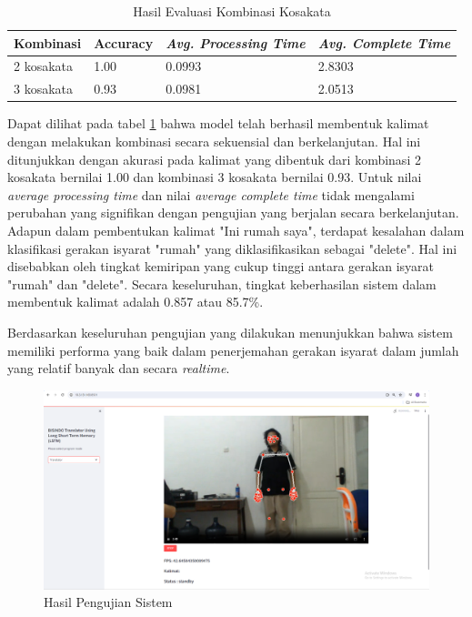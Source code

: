 \begin{table}[H]
  \caption{Hasil Evaluasi Kombinasi Kosakata}
  \label{tb:evaluasiKombinasi}
  \centering
  \begin{tabular}{llll}
    \hline
    \textbf{Kombinasi} & \textbf{Accuracy} & \emph{\textbf{Avg. Processing Time}} & \emph{\textbf{Avg. Complete Time}} \\
    \hline
    2 kosakata & 1.00 & 0.0993 & 2.8303 \\
    3 kosakata & 0.93 & 0.0981 & 2.0513 \\
    \hline
  \end{tabular}
\end{table}

Dapat dilihat pada tabel \ref{tb:evaluasiKombinasi} bahwa model telah berhasil membentuk kalimat dengan melakukan kombinasi secara sekuensial dan berkelanjutan. Hal ini ditunjukkan dengan akurasi pada kalimat yang dibentuk dari kombinasi 2 kosakata bernilai 1.00 dan kombinasi 3 kosakata bernilai 0.93. Untuk nilai \emph{average processing time} dan nilai \emph{average complete time} tidak mengalami perubahan yang signifikan dengan pengujian yang berjalan secara berkelanjutan. Adapun dalam pembentukan kalimat "Ini rumah saya", terdapat kesalahan dalam klasifikasi gerakan isyarat "rumah" yang diklasifikasikan sebagai "delete". Hal ini disebabkan oleh tingkat kemiripan yang cukup tinggi antara gerakan isyarat "rumah" dan "delete". Secara keseluruhan, tingkat keberhasilan sistem dalam membentuk kalimat adalah 0.857 atau 85.7\%.

Berdasarkan keseluruhan pengujian yang dilakukan menunjukkan bahwa sistem memiliki performa yang baik dalam penerjemahan gerakan isyarat dalam jumlah yang relatif banyak dan secara \emph{realtime}.

\begin{figure}[ht]
    \centering

    \includegraphics[scale=0.12]{gambar/bab3-layoutweb.png}
 
    \caption{Hasil Pengujian Sistem}
    \label{fig:layoutweb}
\end{figure}